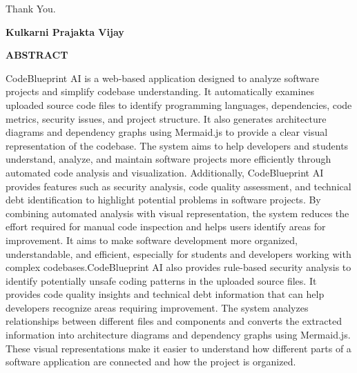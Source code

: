\documentclass[0pt, a4 paper]{report}
\begin{document}
\begin{center}
{\begin{justify}
\end{justify}
    
\vspace{0.3 cm}
\begin{flushleft}
 
 Thank You.   
 
\end{flushleft}
 

\vspace{1 cm}
\begin{flushright}
\textbf{Kulkarni Prajakta Vijay} 

\end{flushright}


\newpage

\setcounter{page}{1}

\clearpage
\pagestyle{fancy}
\begin{center}
    \LARGE\bfseries{ABSTRACT }
\end{center} 
\vspace{0.5 cm}

\justify CodeBlueprint AI is a web-based application designed to analyze software projects and simplify codebase understanding. It automatically examines uploaded source code files to identify programming languages, dependencies, code metrics, security issues, and project structure. It also generates architecture diagrams and dependency graphs using Mermaid.js to provide a clear visual representation of the codebase. The system aims to help developers and students understand, analyze, and maintain software projects more efficiently through automated code analysis and visualization.
Additionally, CodeBlueprint AI provides features such as security analysis, code quality assessment, and technical debt identification to highlight potential problems in software projects. By combining automated analysis with visual representation, the system reduces the effort required for manual code inspection and helps users identify areas for improvement. It aims to make software development more organized, understandable, and efficient, especially for students and developers working with complex codebases.CodeBlueprint AI also provides rule-based security analysis to identify potentially unsafe coding patterns in the uploaded source files. It provides code quality insights and technical debt information that can help developers recognize areas requiring improvement. The system analyzes relationships between different files and components and converts the extracted information into architecture diagrams and dependency graphs using Mermaid.js. These visual representations make it easier to understand how different parts of a software application are connected and how the project is organized.

}
\end{center}
\end{document}
